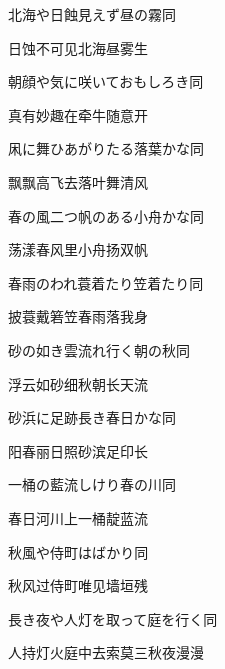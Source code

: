 \begin{haiku}
    {\FH 北海や日蝕見えず昼の霧}\hfill{\FH 同}

    {\FK 日蚀不可见北海昼雾生}
\end{haiku}

\begin{haiku}
    {\FH 朝顔や気に咲いておもしろき}\hfill{\FH 同}

    {\FK 真有妙趣在牵牛随意开}
\end{haiku}

\begin{haiku}
    {\FH 凩に舞ひあがりたる落葉かな}\hfill{\FH 同}

    {\FK 飘飘高飞去落叶舞清风}
\end{haiku}

\begin{haiku}
    {\FH 春の風二つ帆のある小舟かな}\hfill{\FH 同}

    {\FK 荡漾春风里小舟扬双帆}
\end{haiku}

\begin{haiku}
    {\FH 春雨のわれ蓑着たり笠着たり}\hfill{\FH 同}

    {\FK 披蓑戴箬笠春雨落我身}
\end{haiku}

\begin{haiku}
    {\FH 砂の如き雲流れ行く朝の秋}\hfill{\FH 同}

    {\FK 浮云如砂细秋朝长天流}
\end{haiku}

\begin{haiku}
    {\FH 砂浜に足跡長き春日かな}\hfill{\FH 同}

    {\FK 阳春丽日照砂滨足印长}
\end{haiku}

\begin{haiku}
    {\FH 一桶の藍流しけり春の川}\hfill{\FH 同}

    {\FK 春日河川上一桶靛蓝流}
\end{haiku}

\begin{haiku}
    {\FH 秋風や侍町はばかり}\hfill{\FH 同}

    {\FK 秋风过侍町唯见墙垣残}
\end{haiku}

\begin{haiku}
    {\FH 長き夜や人灯を取って庭を行く}\hfill{\FH 同}

    {\FK 人持灯火庭中去索莫三秋夜漫漫}
\end{haiku}

